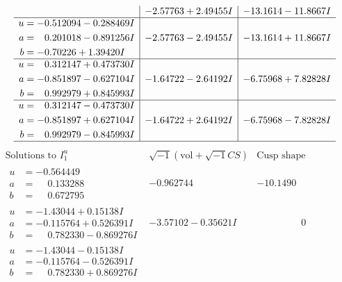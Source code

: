 \documentclass[1p]{elsarticle_modified}
\theoremstyle{definition}
\newcommand{\I}{\sqrt{-1}}
\begin{document}
$$\begin{array}{c|c|c}
 & -2.57763 + 2.49455 I & -13.1614 - 11.8667 I \\ \hline\begin{aligned}
u &= -0.512094 - 0.288469 I \\
a &= \phantom{-}0.201018 - 0.891256 I \\
b &= -0.70226 + 1.39420 I\end{aligned}
 & -2.57763 - 2.49455 I & -13.1614 + 11.8667 I \\ \hline\begin{aligned}
u &= \phantom{-}0.312147 + 0.473730 I \\
a &= -0.851897 - 0.627104 I \\
b &= \phantom{-}0.992979 + 0.845993 I\end{aligned}
 & -1.64722 - 2.64192 I & -6.75968 + 7.82828 I \\ \hline\begin{aligned}
u &= \phantom{-}0.312147 - 0.473730 I \\
a &= -0.851897 + 0.627104 I \\
b &= \phantom{-}0.992979 - 0.845993 I\end{aligned}
 & -1.64722 + 2.64192 I & -6.75968 - 7.82828 I\\
 \hline 
 \end{array}$$\newpage$$\begin{array}{c|c|c}  
\text{Solutions to }I^u_{1}& \I (\text{vol} + \sqrt{-1}CS) & \text{Cusp shape}\\
 \hline 
\begin{aligned}
u &= -0.564449\phantom{ +0.000000I} \\
a &= \phantom{-}0.133288\phantom{ +0.000000I} \\
b &= \phantom{-}0.672795\phantom{ +0.000000I}\end{aligned}
 & -0.962744\phantom{ +0.000000I} & -10.1490\phantom{ +0.000000I} \\ \hline\begin{aligned}
u &= -1.43044 + 0.15138 I \\
a &= -0.115764 + 0.526391 I \\
b &= \phantom{-}0.782330 - 0.869276 I\end{aligned}
 & -3.57102 - 0.35621 I & \phantom{-0.000000 } 0 \\ \hline\begin{aligned}
u &= -1.43044 - 0.15138 I \\
a &= -0.115764 - 0.526391 I \\
b &= \phantom{-}0.782330 + 0.869276 I\end{aligned}

\end{array}$$
\end{document}

